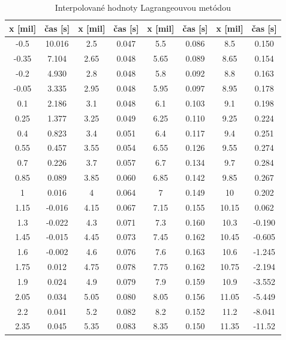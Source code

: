 \documentclass[12pt]{article}
\begin{document}
\begin{listing}[language=C++, caption=Funkcia Heapify]
\begin{table}[!ht]
   \caption{Interpolované hodnoty Lagrangeouvou metódou}
    \begin{tabular}{|c|c||c|c||c|c||c|c|}
\hline
\rowcolor{lightblue}
\textbf{x {[}mil{]}} & \textbf{čas {[}s{]}} & \textbf{x {[}mil{]}} & \textbf{čas {[}s{]}} & \textbf{x {[}mil{]}} & \textbf{čas {[}s{]}} & \textbf{x {[}mil{]}} & \textbf{čas {[}s{]}} \\ 
\hline 
-0.5 & 10.016 & 2.5	& 0.047	& 5.5 & 0.086 & 8.5 & 0.150 \\ \hline
-0.35 & 7.104 & 2.65 & 0.048 & 5.65 & 0.089	& 8.65 & 0.154 \\ \hline
-0.2 & 4.930 & 2.8 & 0.048 & 5.8 & 0.092 & 8.8 & 0.163 \\ \hline
-0.05 & 3.335 & 2.95 & 0.048 & 5.95 & 0.097 & 8.95 & 0.178 \\ \hline
0.1	& 2.186 & 3.1 & 0.048 & 6.1 & 0.103 & 9.1 & 0.198 \\ \hline
0.25 & 1.377 & 3.25 & 0.049 & 6.25 & 0.110 & 9.25 & 0.224 \\ \hline
0.4 & 0.823 & 3.4 & 0.051 & 6.4 & 0.117 & 9.4 & 0.251 \\ \hline
0.55 & 0.457 & 3.55 & 0.054 & 6.55 & 0.126 & 9.55 & 0.274 \\ \hline
0.7	& 0.226 & 3.7 & 0.057 & 6.7 & 0.134 & 9.7 & 0.284 \\ \hline
0.85 & 0.089 & 3.85	& 0.060 & 6.85 & 0.142 & 9.85 & 0.267 \\ \hline
1 & 0.016 & 4 & 0.064 & 7 & 0.149 & 10 & 0.202 \\ \hline
1.15 & -0.016 & 4.15 & 0.067 & 7.15 & 0.155	& 10.15 & 0.062 \\ \hline
1.3 & -0.022 & 4.3 & 0.071 & 7.3 & 0.160 & 10.3 & -0.190 \\ \hline
1.45 & -0.015 & 4.45 & 0.073 & 7.45 & 0.162 & 10.45 & -0.605 \\ \hline
1.6 & -0.002 & 4.6 & 0.076 & 7.6 & 0.163 & 10.6 & -1.245 \\ \hline
1.75 & 0.012 & 4.75  & 0.078 & 7.75 & 0.162 & 10.75 & -2.194 \\ \hline
1.9 & 0.024	& 4.9 & 0.079 & 7.9 & 0.159	& 10.9 & -3.552 \\ \hline
2.05 & 0.034 & 5.05 & 0.080 & 8.05 & 0.156 & 11.05 & -5.449 \\ \hline
2.2 & 0.041	& 5.2 & 0.082 & 8.2 & 0.152	& 11.2 & -8.041 \\ \hline
2.35 & 0.045 & 5.35 & 0.083 & 8.35 & 0.150 & 11.35 & -11.52 \\ \hline


\end{tabular}
\end{table}
\end{listing}
\end{document}
